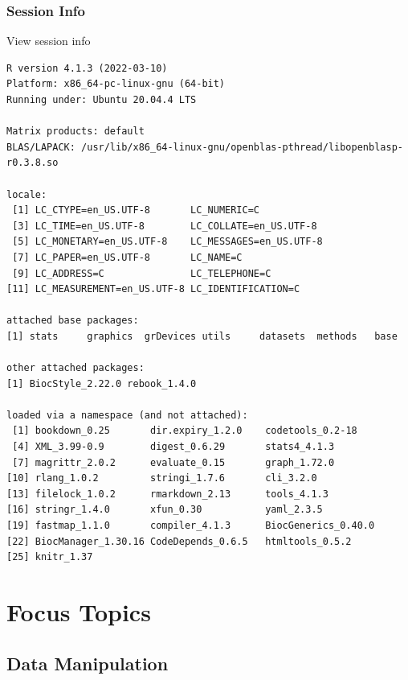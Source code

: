 \documentclass[
]{book}
\begin{document}
\hypertarget{session-info-1}{%
\section*{Session Info}\label{session-info-1}}

View session info

\begin{verbatim}
R version 4.1.3 (2022-03-10)
Platform: x86_64-pc-linux-gnu (64-bit)
Running under: Ubuntu 20.04.4 LTS

Matrix products: default
BLAS/LAPACK: /usr/lib/x86_64-linux-gnu/openblas-pthread/libopenblasp-r0.3.8.so

locale:
 [1] LC_CTYPE=en_US.UTF-8       LC_NUMERIC=C              
 [3] LC_TIME=en_US.UTF-8        LC_COLLATE=en_US.UTF-8    
 [5] LC_MONETARY=en_US.UTF-8    LC_MESSAGES=en_US.UTF-8   
 [7] LC_PAPER=en_US.UTF-8       LC_NAME=C                 
 [9] LC_ADDRESS=C               LC_TELEPHONE=C            
[11] LC_MEASUREMENT=en_US.UTF-8 LC_IDENTIFICATION=C       

attached base packages:
[1] stats     graphics  grDevices utils     datasets  methods   base     

other attached packages:
[1] BiocStyle_2.22.0 rebook_1.4.0    

loaded via a namespace (and not attached):
 [1] bookdown_0.25       dir.expiry_1.2.0    codetools_0.2-18   
 [4] XML_3.99-0.9        digest_0.6.29       stats4_4.1.3       
 [7] magrittr_2.0.2      evaluate_0.15       graph_1.72.0       
[10] rlang_1.0.2         stringi_1.7.6       cli_3.2.0          
[13] filelock_1.0.2      rmarkdown_2.13      tools_4.1.3        
[16] stringr_1.4.0       xfun_0.30           yaml_2.3.5         
[19] fastmap_1.1.0       compiler_4.1.3      BiocGenerics_0.40.0
[22] BiocManager_1.30.16 CodeDepends_0.6.5   htmltools_0.5.2    
[25] knitr_1.37         
\end{verbatim}

\hypertarget{part-focus-topics}{%
\part{Focus Topics}\label{part-focus-topics}}

\hypertarget{datamanipulation}{%
\chapter{Data Manipulation}\label{datamanipulation}}
\end{document}
